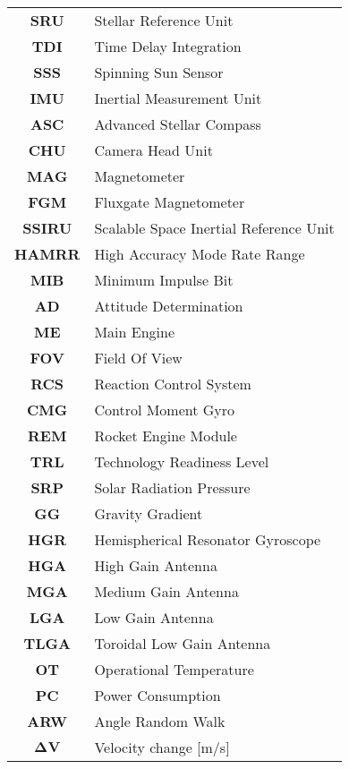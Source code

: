 \begin{multicols}{2}
{\begin{xltabular}{\linewidth}{c>{\raggedright\arraybackslash}X}
		\textbf{SRU} & Stellar Reference Unit \\
		\textbf{TDI} & Time Delay Integration \\
		\textbf{SSS} & Spinning Sun Sensor \\
		\textbf{IMU} & Inertial Measurement Unit \\
		\textbf{ASC} & Advanced Stellar Compass \\
		\textbf{CHU} & Camera Head Unit \\
		\textbf{MAG} & Magnetometer \\
		\textbf{FGM} & Fluxgate Magnetometer \\
		\textbf{SSIRU} & Scalable Space Inertial Reference Unit \\
		\textbf{HAMRR} & High Accuracy Mode Rate Range \\
		\textbf{MIB} & Minimum Impulse Bit \\
		\textbf{AD} & Attitude Determination \\
		\textbf{ME} & Main Engine \\
		\textbf{FOV} & Field Of View \\
		\textbf{RCS} & Reaction Control System \\
		\textbf{CMG} & Control Moment Gyro \\
		\textbf{REM} & Rocket Engine Module \\
		\textbf{TRL} & Technology Readiness Level \\
		\textbf{SRP} & Solar Radiation Pressure \\
		\textbf{GG} & Gravity Gradient \\
		\textbf{HGR} & Hemispherical Resonator Gyroscope \\
		\textbf{HGA} & High Gain Antenna \\
		\textbf{MGA} & Medium Gain Antenna \\
		\textbf{LGA} & Low Gain Antenna \\
		\textbf{TLGA} & Toroidal Low Gain Antenna \\
		\textbf{OT} & Operational Temperature \\
		\textbf{PC} & Power Consumption \\
		\textbf{ARW} & Angle Random Walk \\
		$\boldsymbol{\Delta V}$ & Velocity change [m/s]
 	\end{xltabular}
	\unskip
	\unpenalty
	\unpenalty}
	\unvbox\ltmcbox
\end{multicols}
